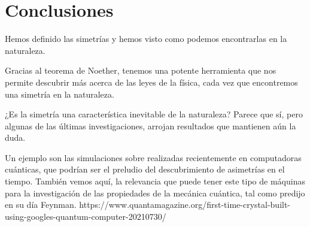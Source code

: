 \chapter{Conclusiones}\label{ch:conclusiones}
Hemos definido las simetrías y hemos visto como podemos encontrarlas en la naturaleza.

Gracias al teorema de Noether, tenemos una potente herramienta que nos permite descubrir más acerca de las leyes de la física, cada vez que encontremos una simetría en la naturaleza.

¿Es la simetría una característica inevitable de la naturaleza?
Parece que sí, pero algunas de las últimas investigaciones, arrojan resultados que mantienen aún la duda.

Un ejemplo son las simulaciones sobre  realizadas recientemente en computadoras cuánticas, que podrían ser el preludio del descubrimiento de asimetrías en el tiempo. También vemos aquí, la relevancia que puede tener este tipo de máquinas para la investigación de las propiedades de la mecánica cuántica, tal como predijo en su día Feynman.
https://www.quantamagazine.org/first-time-crystal-built-using-googles-quantum-computer-20210730/

